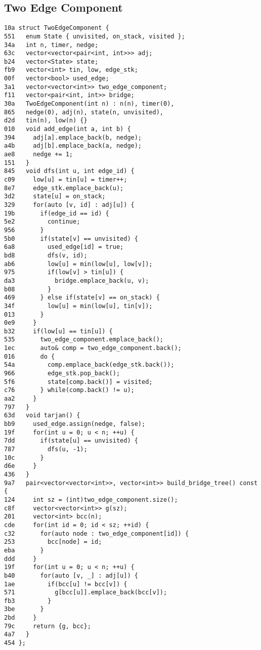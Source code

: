 \documentclass[10pt, a4paper, twoside]{article}
\begin{document}
\subsection{Two Edge Component}
\begin{lstlisting}
10a struct TwoEdgeComponent {
551   enum State { unvisited, on_stack, visited };
34a   int n, timer, nedge;
63c   vector<vector<pair<int, int>>> adj;
b24   vector<State> state;
fb9   vector<int> tin, low, edge_stk;
00f   vector<bool> used_edge;
3a1   vector<vector<int>> two_edge_component;
f11   vector<pair<int, int>> bridge;
30a   TwoEdgeComponent(int n) : n(n), timer(0),
865   nedge(0), adj(n), state(n, unvisited),
d2d   tin(n), low(n) {}
010   void add_edge(int a, int b) {
394     adj[a].emplace_back(b, nedge);
a4b     adj[b].emplace_back(a, nedge);
ae8     nedge += 1;
151   }
845   void dfs(int u, int edge_id) {
c09     low[u] = tin[u] = timer++;
8e7     edge_stk.emplace_back(u);
3d2     state[u] = on_stack;
329     for(auto [v, id] : adj[u]) {
19b       if(edge_id == id) {
5e2         continue;
956       }
5b0       if(state[v] == unvisited) {
6a8         used_edge[id] = true;
bd8         dfs(v, id);
ab6         low[u] = min(low[u], low[v]);
975         if(low[v] > tin[u]) {
da3           bridge.emplace_back(u, v);
b08         }
469       } else if(state[v] == on_stack) {
34f         low[u] = min(low[u], tin[v]);
013       }
0e9     }
b32     if(low[u] == tin[u]) {
535       two_edge_component.emplace_back();
1ec       auto& comp = two_edge_component.back();
016       do {
54a         comp.emplace_back(edge_stk.back());
966         edge_stk.pop_back();
5f6         state[comp.back()] = visited;
c76       } while(comp.back() != u);
aa2     }
797   }
63d   void tarjan() {
bb9     used_edge.assign(nedge, false);
19f     for(int u = 0; u < n; ++u) {
7dd       if(state[u] == unvisited) {
787         dfs(u, -1);
10c       }
d6e     }
436   }
9a7   pair<vector<vector<int>>, vector<int>> build_bridge_tree() const {
124     int sz = (int)two_edge_component.size();
c8f     vector<vector<int>> g(sz);
201     vector<int> bcc(n);
cde     for(int id = 0; id < sz; ++id) {
c32       for(auto node : two_edge_component[id]) {
253         bcc[node] = id;
eba       }
ddd     }
19f     for(int u = 0; u < n; ++u) {
b40       for(auto [v, _] : adj[u]) {
1ae         if(bcc[u] != bcc[v]) {
571           g[bcc[u]].emplace_back(bcc[v]);
fb3         }
3be       }
2bd     }
79c     return {g, bcc};
4a7   }
454 };
\end{lstlisting}
\end{document}
